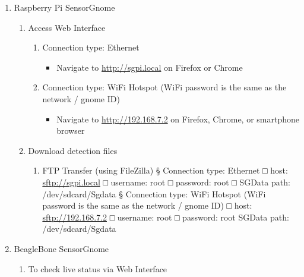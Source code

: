 \documentclass[
]{book}
\providecommand{\tightlist}{%
  \setlength{\itemsep}{0pt}\setlength{\parskip}{0pt}}
\begin{document}
\begin{enumerate}
\def\labelenumi{\arabic{enumi}.}
\tightlist
\item
  Raspberry Pi SensorGnome

  \begin{enumerate}
  \def\labelenumii{\Alph{enumii})}
  \tightlist
  \item
    Access Web Interface

    \begin{enumerate}
    \def\labelenumiii{\alph{enumiii})}
    \tightlist
    \item
      Connection type: Ethernet

      \begin{itemize}
      \tightlist
      \item
        Navigate to \url{http://sgpi.local} on Firefox or Chrome
      \end{itemize}
    \item
      Connection type: WiFi Hotspot (WiFi password is the same as the network / gnome ID)

      \begin{itemize}
      \tightlist
      \item
        Navigate to \url{http://192.168.7.2} on Firefox, Chrome, or smartphone browser
      \end{itemize}
    \end{enumerate}
  \item
    Download detection files

    \begin{enumerate}
    \def\labelenumiii{\alph{enumiii})}
    \tightlist
    \item
      FTP Transfer (using FileZilla)
      § Connection type: Ethernet
      □ host: \url{sftp://sgpi.local}
      □ username: root
      □ password: root
      □ SGData path: /dev/sdcard/Sgdata
      § Connection type: WiFi Hotspot (WiFi password is the same as the network / gnome ID)
      □ host: \url{sftp://192.168.7.2}
      □ username: root
      □ password: root
      SGData path: /dev/sdcard/Sgdata
    \end{enumerate}
  \end{enumerate}
\item
  BeagleBone SensorGnome

  \begin{enumerate}
  \def\labelenumii{\Alph{enumii})}
  \tightlist
  \item
    To check live status via Web Interface


\end{enumerate}
\end{enumerate}
\end{document}
